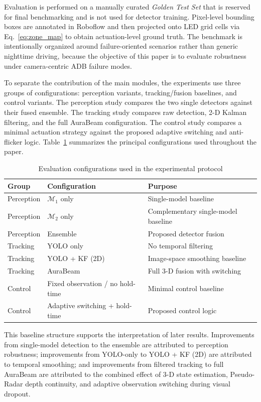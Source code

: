 \documentclass[pdflatex,sn-mathphys-num]{sn-jnl}%
\theoremstyle{thmstyleone}%
\theoremstyle{thmstyletwo}%
\theoremstyle{thmstylethree}%
\begin{document}
Evaluation is performed on a manually curated \emph{Golden Test Set}
that is reserved for final benchmarking and is not used for detector
training. Pixel-level bounding boxes are annotated in Roboflow and then
projected onto LED grid cells via Eq.~\eqref{eq:zone_map} to obtain
actuation-level ground truth. The benchmark is intentionally organized
around failure-oriented scenarios rather than generic nighttime driving,
because the objective of this paper is to evaluate robustness under
camera-centric ADB failure modes.

To separate the contribution of the main modules, the experiments use
three groups of configurations: perception variants, tracking/fusion
baselines, and control variants. The perception study compares the two
single detectors against their fused ensemble. The tracking study
compares raw detection, 2-D Kalman filtering, and the full AuraBeam
configuration. The control study compares a minimal actuation strategy
against the proposed adaptive switching and anti-flicker logic.
Table~\ref{tab:eval_configs} summarizes the principal configurations
used throughout the paper.

\begin{table}[t]
\centering
\caption{Evaluation configurations used in the experimental protocol}
\label{tab:eval_configs}
\begin{tabular}{lll}
\hline
\textbf{Group} & \textbf{Configuration} & \textbf{Purpose} \\
\hline
Perception & $\mathcal{M}_1$ only & Single-model baseline \\
Perception & $\mathcal{M}_2$ only & Complementary single-model baseline \\
Perception & Ensemble & Proposed detector fusion \\
Tracking & YOLO only & No temporal filtering \\
Tracking & YOLO + KF (2D) & Image-space smoothing baseline \\
Tracking & AuraBeam & Full 3-D fusion with switching \\
Control & Fixed observation / no hold-time & Minimal control baseline \\
Control & Adaptive switching + hold-time & Proposed control logic \\
\hline
\end{tabular}
\end{table}

This baseline structure supports the interpretation of later results.
Improvements from single-model detection to the ensemble are attributed
to perception robustness; improvements from YOLO-only to YOLO + KF (2D)
are attributed to temporal smoothing; and improvements from filtered
tracking to full AuraBeam are attributed to the combined effect of 3-D
state estimation, Pseudo-Radar depth continuity, and adaptive
observation switching during visual dropout.
\end{document}
